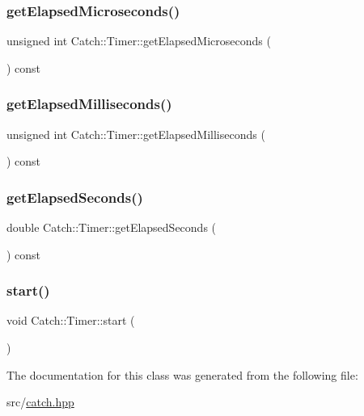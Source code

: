 \subsubsection{\texorpdfstring{get\+Elapsed\+Microseconds()}{getElapsedMicroseconds()}}
{\footnotesize\ttfamily unsigned int Catch\+::\+Timer\+::get\+Elapsed\+Microseconds (\begin{DoxyParamCaption}{ }\end{DoxyParamCaption}) const}

\mbox{\label{class_catch_1_1_timer_a2081b2d36950ab6912e7c4958afe0099}} 
\subsubsection{\texorpdfstring{get\+Elapsed\+Milliseconds()}{getElapsedMilliseconds()}}
{\footnotesize\ttfamily unsigned int Catch\+::\+Timer\+::get\+Elapsed\+Milliseconds (\begin{DoxyParamCaption}{ }\end{DoxyParamCaption}) const}

\mbox{\label{class_catch_1_1_timer_ae1615c8a9aa44b7a96cfe8a35d34e5de}} 
\subsubsection{\texorpdfstring{get\+Elapsed\+Seconds()}{getElapsedSeconds()}}
{\footnotesize\ttfamily double Catch\+::\+Timer\+::get\+Elapsed\+Seconds (\begin{DoxyParamCaption}{ }\end{DoxyParamCaption}) const}

\mbox{\label{class_catch_1_1_timer_a0a56e879e43f36c102bf9ea8b5fc8b72}} 
\subsubsection{\texorpdfstring{start()}{start()}}
{\footnotesize\ttfamily void Catch\+::\+Timer\+::start (\begin{DoxyParamCaption}{ }\end{DoxyParamCaption})}



The documentation for this class was generated from the following file\+:\begin{DoxyCompactItemize}
\item 
src/\hyperlink{catch_8hpp}{catch.\+hpp}\end{DoxyCompactItemize}
